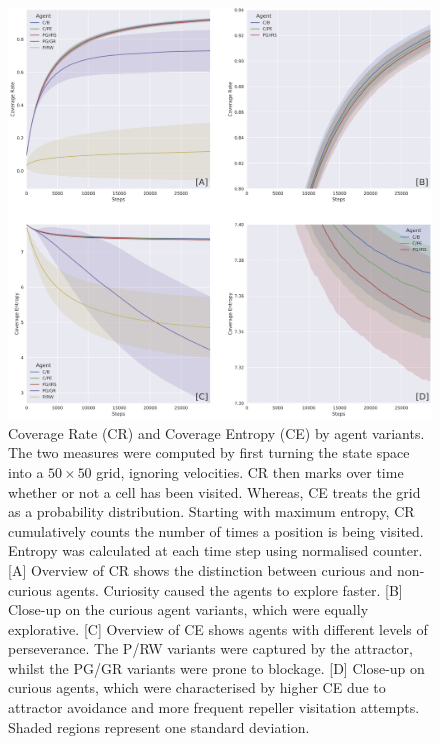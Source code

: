 \documentclass[utf8]{frontiersSCNS}
\begin{document}
\begin{figure}[bh!]
	\begin{center}
	\includegraphics[width=18cm]{tsplot-agnt-covent-v1}
	\end{center}
	\caption{Coverage Rate (CR) and Coverage Entropy (CE) by agent variants. The two measures were computed by first turning the state space into a $50\times 50$ grid, ignoring velocities. CR then marks over time whether or not a cell has been visited. Whereas, CE treats the grid as a probability distribution. Starting with maximum entropy, CR cumulatively counts the number of times a position is being visited. Entropy was calculated at each time step using normalised counter. [A] Overview of CR shows the distinction between curious and non-curious agents. Curiosity caused the agents to explore faster. [B] Close-up on the curious agent variants, which were equally explorative. [C] Overview of CE shows agents with different levels of perseverance. The P/RW variants were captured by the attractor, whilst the PG/GR variants were prone to blockage. [D] Close-up on curious agents, which were characterised by higher CE due to attractor avoidance and more frequent repeller visitation attempts. Shaded regions represent one standard deviation.}
	\label{fig:covent}
\end{figure}
\end{document}
